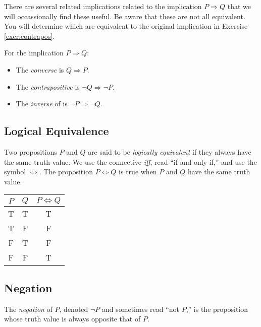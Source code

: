 There are several related implications related to the implication $P\Rightarrow Q$ that we will occassionally find these useful. Be aware that these are not all equivalent. You will determine which are equivalent to the original implication in Exercise \ref{exer:contrapos}.
\begin{definition} 
For the implication $P\Rightarrow Q$:
\begin{itemize}\itemsep0pt
\item The \emph{converse}  is $Q\Rightarrow P$.
\item The \emph{contrapositive}  is $\neg Q\Rightarrow\neg P$.
\item The \emph{inverse} of is $\neg P\Rightarrow\neg Q$.
\end{itemize}
\end{definition}

\subsection{Logical Equivalence}

\begin{definition}
Two propositions $P$ and $Q$ are said to be \emph{logically equivalent}  if they always have the same truth value. We use the connective \emph{iff}, read ``if and only if,'' and use the symbol $\Leftrightarrow$. The proposition $P\Leftrightarrow Q$ is true when $P$ and $Q$ have the same truth value. 
\end{definition}

\begin{center}
\begin{tabular}[t]{|c|c|c|}
\hline
$P$ & $Q$ & $P\Leftrightarrow Q$ \\
\hline
\hline
T & T & T \\
\hline
T & F & F \\
\hline
F & T & F\\
\hline
F & F & T\\
\hline
\end{tabular}
\end{center}

\subsection{Negation}\label{neg1}

\begin{definition}
The \emph{negation} of $P$, denoted $\neg P$ and sometimes read ``not $P$,'' is the proposition whose truth value is always opposite that of $P$. 
\end{definition}

